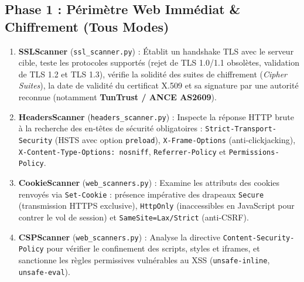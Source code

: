 \subsection{Phase 1 : Périmètre Web Immédiat \& Chiffrement (Tous Modes)}
\begin{enumerate}
    \item \textbf{SSLScanner} (\texttt{ssl\_scanner.py}) : Établit un handshake TLS avec le serveur cible, teste les protocoles supportés (rejet de TLS 1.0/1.1 obsolètes, validation de TLS 1.2 et TLS 1.3), vérifie la solidité des suites de chiffrement (\textit{Cipher Suites}), la date de validité du certificat X.509 et sa signature par une autorité reconnue (notamment \textbf{TunTrust / ANCE AS2609}).
    \item \textbf{HeadersScanner} (\texttt{headers\_scanner.py}) : Inspecte la réponse HTTP brute à la recherche des en-têtes de sécurité obligatoires : \texttt{Strict-Transport-Security} (HSTS avec option \texttt{preload}), \texttt{X-Frame-Options} (anti-clickjacking), \texttt{X-Content-Type-Options: nosniff}, \texttt{Referrer-Policy} et \texttt{Permissions-Policy}.
    \item \textbf{CookieScanner} (\texttt{web\_scanners.py}) : Examine les attributs des cookies renvoyés via \texttt{Set-Cookie} : présence impérative des drapeaux \texttt{Secure} (transmission HTTPS exclusive), \texttt{HttpOnly} (inaccessibles en JavaScript pour contrer le vol de session) et \texttt{SameSite=Lax/Strict} (anti-CSRF).
    \item \textbf{CSPScanner} (\texttt{web\_scanners.py}) : Analyse la directive \texttt{Content-Security-Policy} pour vérifier le confinement des scripts, styles et iframes, et sanctionne les règles permissives vulnérables au XSS (\texttt{unsafe-inline}, \texttt{unsafe-eval}).
\end{enumerate}

